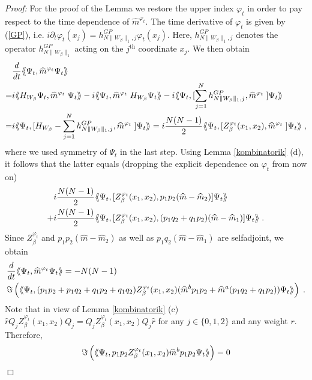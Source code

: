 \documentclass[11pt, english, american]{article}
\newcommand{\laa}{\langle\hspace{-0.08cm}\langle}
\newcommand{\raa}{\rangle\hspace{-0.08cm}\rangle}
\newenvironment{proof}{\emph{Proof:}}{\begin{flushright} $ \Box $ \end{flushright}}
\renewcommand{\phi}{\varphi}
\newcommand{\potdiff}{Z}
\begin{document}
\begin{proof} For the proof of the Lemma we restore the upper index $\phi_t$ in order to pay respect to the time dependence of
$\widehat{m}^{\phi_t}$. 
The time derivative of $\phi_t$ is given by (\ref{GP}), i.e. $i\partial_t \phi_t(x_j)=h_{N \|W_\beta\|_1,j}^{GP}\phi_t(x_j)$. Here, $h_{N \|W_\beta\|_1,j}^{GP}$ denotes the  operator $h_{N \|W_\beta\|_1}^{GP}$ acting on the $j^{\text{th}}$ coordinate $x_j$.
We then obtain
\begin{align*}&
\frac{d}{dt}\laa\Psi_t,\widehat{m}^{\phi_t}\Psi_t\raa
\\=&
i\laa H_{W_\beta}\Psi_t
,\widehat{m}^{\phi_t}\;\Psi_t\raa
-
i\laa\Psi_t
,\widehat{m}^{\phi_t}\;H_{W_\beta}\Psi_t\raa
-
i\laa \Psi_t
,[\sum_{j=1}^N h_{N \|W_\beta\|_1,j}^{GP},\widehat{m}^{\phi_t}\;]\Psi_t\raa
%
\nonumber
\\=&i\laa\Psi_t
,[H_{W_\beta}-\sum_{j=1}^N h_{N \|W_\beta\|_1,j}^{GP},\widehat{m}^{\phi_t}\;]\Psi_t\raa=i\frac{N(N-1)}{2}\laa\Psi_t
,[\potdiff^{\phi_t}_\beta(x_1,x_2),\widehat{m}^{\phi_t}\;]\Psi_t\raa
\;,
\end{align*}
where we used symmetry of $\Psi_t$ in the last step.
Using Lemma \ref{kombinatorik} (d), it follows that the latter equals (dropping the explicit dependence on $\phi_t$ from now on)
\begin{align*}&i\frac{N(N-1)}{2}\laa\Psi_t
,[\potdiff^{\phi_t}_\beta(x_1,x_2),p_1p_2(\widehat{m}-\widehat{m}_2)]\Psi_t\raa
%
\\
+&i\frac{N(N-1)}{2}\laa\Psi_t
,[\potdiff^{\phi_t}_\beta(x_1,x_2),(p_1q_2+q_1p_2)(\widehat{m}-\widehat{m}_1)]\Psi_t\raa\;.
\end{align*}
Since $\potdiff^{\phi_t}_\beta$ and $p_1p_2(\widehat{m}-\widehat{m}_2)$ as well as $p_1q_2(\widehat{m}-\widehat{m}_1)$ are selfadjoint, we obtain
\begin{align*}
&\frac{d}{dt}\laa\Psi_t,\widehat{m}^{\phi_t}\Psi_t\raa
=-N(N-1)\\&\Im\left(\laa\Psi_t ,(p_{1}p_{2}+p_{1}q_{2}+q_{1}p_{2}+q_{1}q_{2})\potdiff^{\phi_t}_\beta(x_1,x_2)( \widehat{m}^bp_{1}p_{2}+\widehat{m}^a(p_{1}q_{2}+q_1p_2))
\Psi_t\raa\right)\;.
\end{align*}
Note that in view of Lemma \ref{kombinatorik} (c) $\widehat{r}Q_j\potdiff^{\phi_t}_\beta(x_1,x_2) Q_j= Q_j\potdiff^{\phi_t}_\beta(x_1,x_2) Q_j\widehat{r}$ for any $j\in\{0,1,2\}$ and any weight $r$. Therefore, 
\begin{align*}
\Im\left(\laa\Psi_t ,p_{1}p_{2}\potdiff^{\phi_t}_\beta(x_1,x_2) \widehat{m}^bp_{1}p_{2}
\Psi_t\raa\right)&=0\\

\end{align*}
\end{proof}
\end{document}

